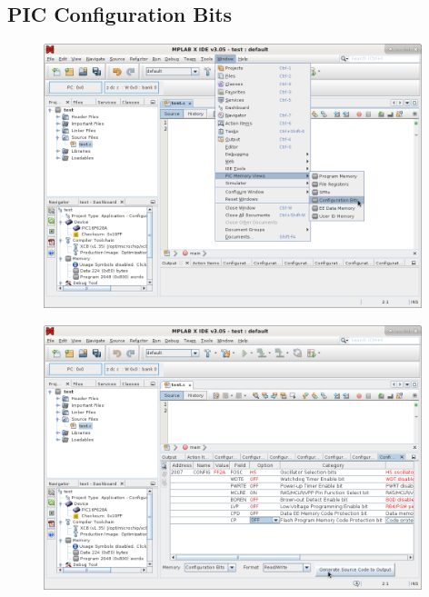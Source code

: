 \subsection{PIC Configuration Bits}
\begin{figure}[H]
\center
\includegraphics[width=0.98\textwidth]{img/hmd/mplab19.png} 
\end{figure} 

\begin{figure}[H]
\center
\includegraphics[width=0.98\textwidth]{img/hmd/mplab20.png} 
\end{figure} 


